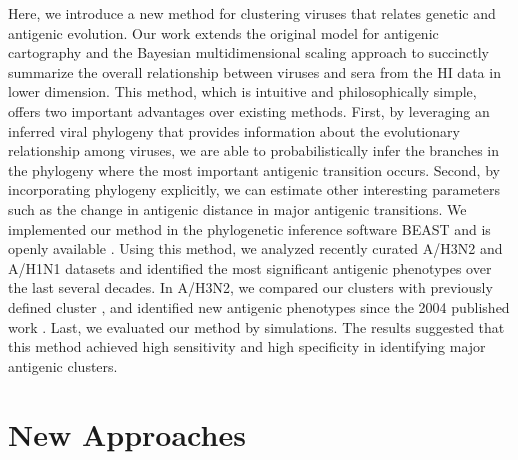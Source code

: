 \documentclass[11pt,oneside,letterpaper]{article}
\begin{document}
Here, we introduce a new method for clustering viruses that relates genetic and antigenic evolution. 
Our work extends the original model for antigenic cartography \cite{smith_mapping_2004} and the Bayesian multidimensional scaling approach \cite{bedford_integrating_2014} to succinctly summarize the overall relationship between viruses and sera from the HI data in lower dimension.
This method, which is intuitive and philosophically simple, offers two important advantages over existing methods. 
First, by leveraging an inferred viral phylogeny that provides information about the evolutionary relationship among viruses, we are able to probabilistically infer the branches in the phylogeny where the most important antigenic transition occurs. 
Second, by incorporating phylogeny explicitly, we can estimate other interesting parameters such as the change in antigenic distance in major antigenic transitions. 
We implemented our method in the phylogenetic inference software BEAST and is openly available \cite{BEAST17}.
Using this method, we analyzed recently curated A/H3N2 and A/H1N1 datasets and identified the most significant antigenic phenotypes over the last several decades. 
In A/H3N2, we compared our clusters with previously defined cluster \cite{smith_mapping_2004}, and identified new antigenic phenotypes since the 2004 published work \cite{smith_mapping_2004}. 
Last, we evaluated our method by simulations.
The results suggested that this method achieved high sensitivity and high specificity in identifying major antigenic clusters.






\newpage

\section*{New Approaches}

\end{document}
